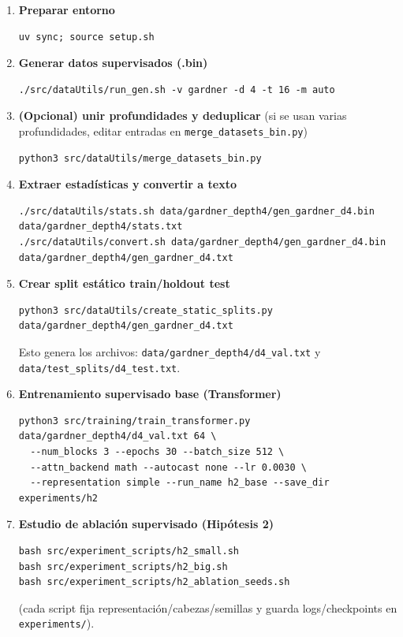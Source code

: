 \documentclass[12pt, a4paper]{article}
\begin{document}
\begin{enumerate}
    \item \textbf{Preparar entorno}

\begin{lstlisting}
uv sync; source setup.sh
\end{lstlisting}

    \item \textbf{Generar datos supervisados (.bin)}
\begin{lstlisting}
./src/dataUtils/run_gen.sh -v gardner -d 4 -t 16 -m auto
\end{lstlisting}

    \item \textbf{(Opcional) unir profundidades y deduplicar}
    (si se usan varias profundidades, editar entradas en \texttt{merge\_datasets\_bin.py})
\begin{lstlisting}
python3 src/dataUtils/merge_datasets_bin.py
\end{lstlisting}

    \item \textbf{Extraer estadísticas y convertir a texto}
\begin{lstlisting}
./src/dataUtils/stats.sh data/gardner_depth4/gen_gardner_d4.bin data/gardner_depth4/stats.txt
./src/dataUtils/convert.sh data/gardner_depth4/gen_gardner_d4.bin data/gardner_depth4/gen_gardner_d4.txt
\end{lstlisting}

    \item \textbf{Crear split estático train/holdout test}
\begin{lstlisting}
python3 src/dataUtils/create_static_splits.py data/gardner_depth4/gen_gardner_d4.txt
\end{lstlisting}
    Esto genera los archivos: \verb|data/gardner_depth4/d4_val.txt| y \verb|data/test_splits/d4_test.txt|.

    \item \textbf{Entrenamiento supervisado base (Transformer)}
\begin{lstlisting}
python3 src/training/train_transformer.py data/gardner_depth4/d4_val.txt 64 \
  --num_blocks 3 --epochs 30 --batch_size 512 \
  --attn_backend math --autocast none --lr 0.0030 \
  --representation simple --run_name h2_base --save_dir experiments/h2
\end{lstlisting}

    \item \textbf{Estudio de ablación supervisado (Hipótesis 2)}
\begin{lstlisting}
bash src/experiment_scripts/h2_small.sh
bash src/experiment_scripts/h2_big.sh
bash src/experiment_scripts/h2_ablation_seeds.sh
\end{lstlisting}
    (cada script fija representación/cabezas/semillas y guarda logs/checkpoints en \texttt{experiments/}).


\end{enumerate}
\end{document}
